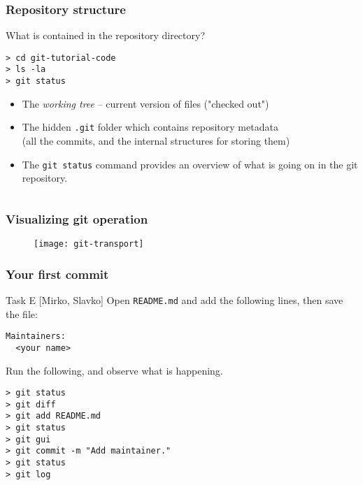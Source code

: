 
\begin{frame}[fragile]

\frametitle{Repository structure}

What is contained in the repository directory?
	
\begin{verbatim}
> cd git-tutorial-code
> ls -la
> git status
\end{verbatim}
	
\begin{itemize}
	\item The \textit{working tree} -- current version of files ("checked out")
	\item The hidden \texttt{.git} folder which contains repository metadata \\ (all the commits, and the internal structures for storing them)
	\item The \texttt{git status} command provides an overview of what is going on in the git repository.
\end{itemize}
\begin{verbatim}
\end{verbatim}
	
\end{frame}


\begin{frame}
	\frametitle{Visualizing git operation}
	
	\begin{figure}
		\texttt{[image: git-transport]}
	\end{figure}
\end{frame}



\begin{frame}[fragile]
	\frametitle{Your first commit}
	
	\begin{block}{Task E [Mirko, Slavko]}
	Open \texttt{README.md} and add the following lines, then save the file:
	\begin{verbatim}
Maintainers:
  <your name>
	\end{verbatim}

Run the following, and observe what is happening.

	\begin{verbatim}
> git status
> git diff
> git add README.md
> git status
> git gui
> git commit -m "Add maintainer."
> git status
> git log
	\end{verbatim}
	
	\end{block}
	
\end{frame}

